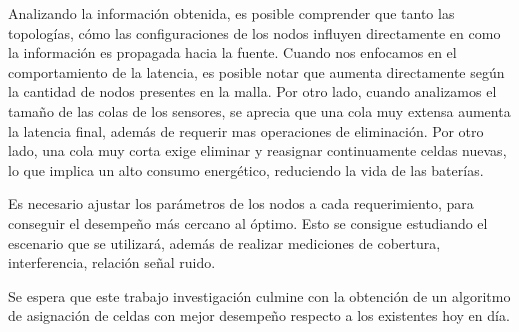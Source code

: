 Analizando la información obtenida, es posible comprender que tanto las topologías, cómo las configuraciones de los nodos influyen directamente en como la información es propagada hacia la fuente. Cuando nos enfocamos en el comportamiento de la latencia, es posible notar que aumenta directamente según la cantidad de nodos presentes en la malla. Por otro lado, cuando analizamos el tamaño de las colas de los sensores, se aprecia que una cola muy extensa aumenta la latencia final, además de requerir mas operaciones de eliminación. Por otro lado, una cola muy corta exige eliminar y reasignar continuamente celdas nuevas, lo que implica un alto consumo energético, reduciendo la vida de las baterías.

Es necesario ajustar los parámetros de los nodos a cada requerimiento, para conseguir el desempeño más cercano al óptimo. Esto se consigue estudiando el escenario que se utilizará, además de realizar mediciones de cobertura, interferencia, relación señal ruido.

Se espera que este trabajo investigación culmine con la obtención de un algoritmo de asignación de celdas con mejor desempeño respecto a los existentes hoy en día.
